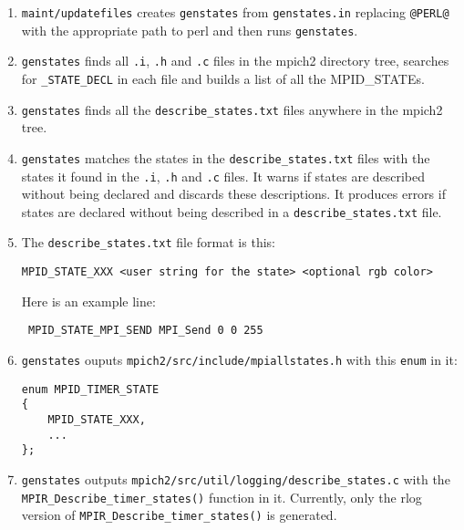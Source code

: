 \documentclass[dvipdfm,11pt]{article}
\begin{document}
\begin{enumerate}
\item \texttt{maint/updatefiles} creates \texttt{genstates} from 
\texttt{genstates.in} replacing \texttt{@PERL@} with the appropriate path to
perl and then runs \texttt{genstates}.

\item \texttt{genstates} finds all \texttt{.i}, \texttt{.h} and \texttt{.c} files 
in the mpich2 directory tree, searches for \texttt{\_STATE\_DECL} in each 
file and builds a list of all the MPID\_STATEs.

\item \texttt{genstates} finds all the \texttt{describe\_states.txt} 
files anywhere in the mpich2 tree.

\item \texttt{genstates} matches the states in the \texttt{describe\_states.txt}
 files with the  states it found in the \texttt{.i}, \texttt{.h} and 
\texttt{.c} files.  It warns if states are described without being declared 
and discards these descriptions.  It produces errors if states are declared 
without being described in a \texttt{describe\_states.txt} file.

\item The \texttt{describe\_states.txt} file format is this:
\begin{verbatim}
MPID_STATE_XXX <user string for the state> <optional rgb color>
\end{verbatim}
 Here is an example line:
\begin{verbatim}
 MPID_STATE_MPI_SEND MPI_Send 0 0 255
\end{verbatim}
 
\item \texttt{genstates} ouputs \texttt{mpich2/src/include/mpiallstates.h} 
with this \texttt{enum} in it:
\begin{verbatim}
enum MPID_TIMER_STATE
{
    MPID_STATE_XXX,
    ...
};
\end{verbatim}

\item \texttt{genstates} outputs 
\texttt{mpich2/src/util/logging/describe\_states.c} with the
\texttt{MPIR\_Describe\_timer\_states()} function in it.  Currently, only 
the rlog version of \texttt{MPIR\_Describe\_timer\_states()} is generated.

\end{enumerate}
\end{document}
